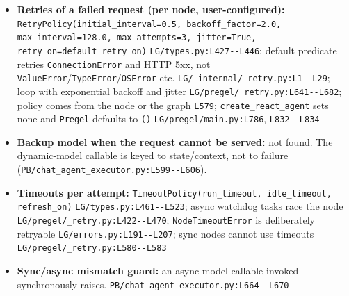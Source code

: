 \begin{itemize}
\item \textbf{Retries of a failed request (per node, user-configured):} \texttt{RetryPolicy(\allowbreak{}initial\_\allowbreak{}interval=0.\allowbreak{}5, backoff\_\allowbreak{}factor=2.\allowbreak{}0, max\_\allowbreak{}interval=128.\allowbreak{}0, max\_\allowbreak{}attempts=3, jitter=True, retry\_\allowbreak{}on=default\_\allowbreak{}retry\_\allowbreak{}on)} \texttt{LG/\allowbreak{}types.\allowbreak{}py:\allowbreak{}L427-\allowbreak{}-\allowbreak{}L446}; default predicate retries \texttt{ConnectionError} and HTTP 5xx, not \texttt{ValueError}/\texttt{TypeError}/\texttt{OSError} etc. \texttt{LG/\allowbreak{}\_\allowbreak{}internal/\allowbreak{}\_\allowbreak{}retry.\allowbreak{}py:\allowbreak{}L1-\allowbreak{}-\allowbreak{}L29}; loop with exponential backoff and jitter \texttt{LG/\allowbreak{}pregel/\allowbreak{}\_\allowbreak{}retry.\allowbreak{}py:\allowbreak{}L641-\allowbreak{}-\allowbreak{}L682}; policy comes from the node or the graph \texttt{L579}; \texttt{create\_\allowbreak{}react\_\allowbreak{}agent} sets none and \texttt{Pregel} defaults to \texttt{(\allowbreak{})} \texttt{LG/\allowbreak{}pregel/\allowbreak{}main.\allowbreak{}py:\allowbreak{}L786}, \texttt{L832-\allowbreak{}-\allowbreak{}L834}
\item \textbf{Backup model when the request cannot be served:} not found. The dynamic-model callable is keyed to state/context, not to failure (\texttt{PB/\allowbreak{}chat\_\allowbreak{}agent\_\allowbreak{}executor.\allowbreak{}py:\allowbreak{}L599-\allowbreak{}-\allowbreak{}L606}).
\item \textbf{Timeouts per attempt:} \texttt{TimeoutPolicy(\allowbreak{}run\_\allowbreak{}timeout, idle\_\allowbreak{}timeout, refresh\_\allowbreak{}on)} \texttt{LG/\allowbreak{}types.\allowbreak{}py:\allowbreak{}L461-\allowbreak{}-\allowbreak{}L523}; async watchdog tasks race the node \texttt{LG/\allowbreak{}pregel/\allowbreak{}\_\allowbreak{}retry.\allowbreak{}py:\allowbreak{}L422-\allowbreak{}-\allowbreak{}L470}; \texttt{NodeTimeoutError} is deliberately retryable \texttt{LG/\allowbreak{}errors.\allowbreak{}py:\allowbreak{}L191-\allowbreak{}-\allowbreak{}L207}; sync nodes cannot use timeouts \texttt{LG/\allowbreak{}pregel/\allowbreak{}\_\allowbreak{}retry.\allowbreak{}py:\allowbreak{}L580-\allowbreak{}-\allowbreak{}L583}
\item \textbf{Sync/async mismatch guard:} an async model callable invoked synchronously raises. \texttt{PB/\allowbreak{}chat\_\allowbreak{}agent\_\allowbreak{}executor.\allowbreak{}py:\allowbreak{}L664-\allowbreak{}-\allowbreak{}L670}
\end{itemize}

